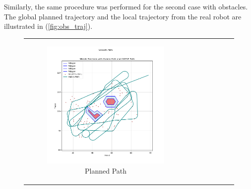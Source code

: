

\vspace*{6mm}   


Similarly, the same procedure was performed for the second case with obstacles. The global planned trajectory and the local trajectory from the real robot are illustrated in (\autoref{fig:obs_traj}). 

\begin{figure}[H]
    \centering
    \begin{tabular}{cc} 
        \begin{subfigure}{0.4\textwidth}
            \centering
            \includegraphics[width=\textwidth]{Images/real_robot/path_with_2_obs_v.png}
            \caption{Planned Path}
        \end{subfigure} 
        &
        \begin{subfigure}{0.4\textwidth}
            \centering

\end{subfigure}
\end{tabular}
\end{figure}
